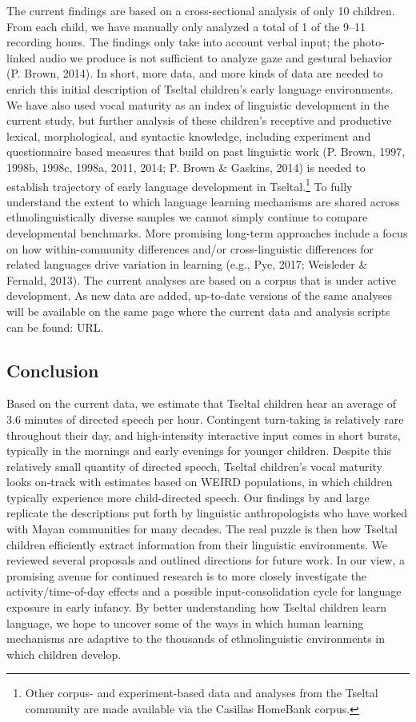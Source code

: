 \documentclass[floatsintext,man]{apa6}
\theoremstyle{definition}
\theoremstyle{definition}
\theoremstyle{definition}
\theoremstyle{remark}
\begin{document}
The current findings are based on a cross-sectional analysis of only 10
children. From each child, we have manually only analyzed a total of 1
of the 9--11 recording hours. The findings only take into account verbal
input; the photo-linked audio we produce is not sufficient to analyze
gaze and gestural behavior (P. Brown, 2014). In short, more data, and
more kinds of data are needed to enrich this initial description of
Tseltal children's early language environments. We have also used vocal
maturity as an index of linguistic development in the current study, but
further analysis of these children's receptive and productive lexical,
morphological, and syntactic knowledge, including experiment and
questionnaire based measures that build on past linguistic work (P.
Brown, 1997, 1998b, 1998c, 1998a, 2011, 2014; P. Brown \& Gaskins, 2014)
is needed to establish trajectory of early language development in
Tseltal.\footnote{Other corpus- and experiment-based data and analyses
  from the Tseltal community are made available via the Casillas
  HomeBank corpus.} To fully understand the extent to which language
learning mechanisms are shared across ethnolinguistically diverse
samples we cannot simply continue to compare developmental benchmarks.
More promising long-term approaches include a focus on how
within-community differences and/or cross-linguistic differences for
related languages drive variation in learning (e.g., Pye, 2017;
Weisleder \& Fernald, 2013). The current analyses are based on a corpus
that is under active development. As new data are added, up-to-date
versions of the same analyses will be available on the same page where
the current data and analysis scripts can be found: URL.

\subsection{Conclusion}\label{disc-conclusion}

Based on the current data, we estimate that Tseltal children hear an
average of 3.6 minutes of directed speech per hour. Contingent
turn-taking is relatively rare throughout their day, and high-intensity
interactive input comes in short bursts, typically in the mornings and
early evenings for younger children. Despite this relatively small
quantity of directed speech, Tseltal children's vocal maturity looks
on-track with estimates based on WEIRD populations, in which children
typically experience more child-directed speech. Our findings by and
large replicate the descriptions put forth by linguistic anthropologists
who have worked with Mayan communities for many decades. The real puzzle
is then how Tseltal children efficiently extract information from their
linguistic environments. We reviewed several proposals and outlined
directions for future work. In our view, a promising avenue for
continued research is to more closely investigate the
activity/time-of-day effects and a possible input-consolidation cycle
for language exposure in early infancy. By better understanding how
Tseltal children learn language, we hope to uncover some of the ways in
which human learning mechanisms are adaptive to the thousands of
ethnolinguistic environments in which children develop.
\end{document}

